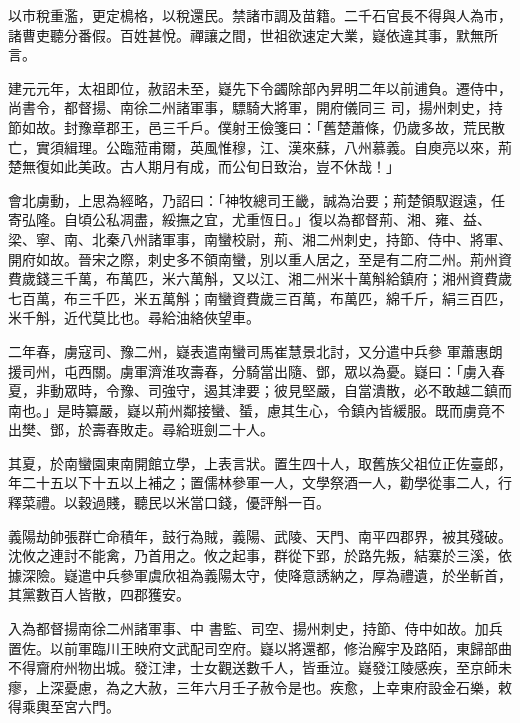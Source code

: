 \begin{pinyinscope}
 以市稅重濫，更定樢格，以稅還民。禁諸市調及苗籍。二千石官長不得與人為市，諸曹吏聽分番假。百姓甚悅。禪讓之間，世祖欲速定大業，嶷依違其事，默無所言。



 建元元年，太祖即位，赦詔未至，嶷先下令蠲除部內昇明二年以前逋負。遷侍中，尚書令，都督揚、南徐二州諸軍事，驃騎大將軍，開府儀同三
 司，揚州刺史，持節如故。封豫章郡王，邑三千戶。僕射王儉箋曰：「舊楚蕭條，仍歲多故，荒民散亡，實須緝理。公臨蒞甫爾，英風惟穆，江、漢來蘇，八州慕義。自庾亮以來，荊楚無復如此美政。古人期月有成，而公旬日致治，豈不休哉！」



 會北虜動，上思為經略，乃詔曰：「神牧總司王畿，誠為治要；荊楚領馭遐遠，任寄弘隆。自頃公私凋盡，綏撫之宜，尤重恆日。」復以為都督荊、湘、雍、益、梁、寧、南、北秦八州諸軍事，南蠻校尉，荊、湘二州刺史，持節、侍中、將軍、開府如故。晉宋之際，刺史多不領南蠻，別以重人居之，至是有二府二州。荊州資費歲錢三千萬，布萬匹，米六萬斛，又以江、湘二州米十萬斛給鎮府；湘州資費歲七百萬，布三千匹，米五萬斛；南蠻資費歲三百萬，布萬匹，綿千斤，絹三百匹，米千斛，近代莫比也。尋給油絡俠望車。



 二年春，虜寇司、豫二州，嶷表遣南蠻司馬崔慧景北討，又分遣中兵參
 軍蕭惠朗援司州，屯西關。虜軍濟淮攻壽春，分騎當出隨、鄧，眾以為憂。嶷曰：「虜入春夏，非動眾時，令豫、司強守，遏其津要；彼見堅嚴，自當潰散，必不敢越二鎮而南也。」是時纂嚴，嶷以荊州鄰接蠻、蜑，慮其生心，令鎮內皆緩服。既而虜竟不出樊、鄧，於壽春敗走。尋給班劍二十人。



 其夏，於南蠻園東南開館立學，上表言狀。置生四十人，取舊族父祖位正佐臺郎，年二十五以下十五以上補之；置儒林參軍一人，文學祭酒一人，勸學從事二人，行釋菜禮。以穀過賤，聽民以米當口錢，優評斛一百。



 義陽劫帥張群亡命積年，鼓行為賊，義陽、武陵、天門、南平四郡界，被其殘破。沈攸之連討不能禽，乃首用之。攸之起事，群從下郢，於路先叛，結寨於三溪，依據深險。嶷遣中兵參軍虞欣祖為義陽太守，使降意誘納之，厚為禮遺，於坐斬首，其黨數百人皆散，四郡獲安。



 入為都督揚南徐二州諸軍事、中
 書監、司空、揚州刺史，持節、侍中如故。加兵置佐。以前軍臨川王映府文武配司空府。嶷以將還都，修治廨宇及路陌，東歸部曲不得齎府州物出城。發江津，士女觀送數千人，皆垂泣。嶷發江陵感疾，至京師未瘳，上深憂慮，為之大赦，三年六月壬子赦令是也。疾愈，上幸東府設金石樂，敕得乘輿至宮六門。




\end{pinyinscope}
